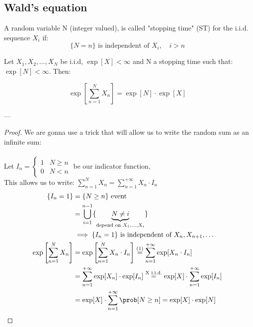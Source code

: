 \subsection{Wald's equation}
\begin{definition}
A random variable N (integer valued), is called "stopping time" (ST) for the i.i.d. sequence $X_i$ if:
\begin{equation}
  \{N=n\} \text{ is independent of }X_i ,\quad i > n
\end{equation}
\end{definition}
\begin{theorem}
Let $X_1, X_2, \dots, X_N $ be i.i.d,  $\exp[X] < \infty$ and N a stopping time such that: $\exp[N] < \infty$. Then:

\begin{equation}
  \exp\left[\sum\limits_{n=1}^N X_n \right] = \exp[N] \cdot \exp[X]
\end{equation}
\end{theorem}
---
\begin{proof}
  We are gonna use a trick that will allow us to write the random sum as an infinite sum:\\ \\
  Let $I_n = \begin{cases} 1 & N \ge n \\ 0 & N<n \end{cases}$ \quad be our indicator function,\\
  This allows us to write: $\sum\limits_{n=1}^N X_n = \sum\limits_{n=1}^{+\infty} X_n \cdot I_n$
\begin{equation}\begin{split}
  \{I_n=1\} &= \{N \ge n \} \text{ event}\\
  &= \bigcup\limits_{i=1}^{n-1}\{\underbrace{N \neq i}_{\text{depend on } X_1, \dots, X_i} \} \\
  &\implies \{I_n=1\} \text{ is independent of }X_n, X_{n+1}, \dots\\
  \exp\left[\sum\limits_{n=1}^{N}X_n\right] &= \exp\left[\sum\limits_{n=1}^{N}X_n \cdot I_n \right] \stackrel{(1)}{=} \sum\limits_{n=1}^{+\infty}\exp[X_n \cdot I_n] \\
  &=\sum\limits_{n=1}^{+\infty}\exp[X_n] \cdot \exp[I_n] \stackrel{\text{X i.i.d.}}{=} \exp[X]\cdot\sum\limits_{n=1}^{+\infty}\exp[I_n] \\
  &= \exp[X] \cdot \sum\limits_{n=1}^{+\infty}\prob[N \ge n] = \exp[X] \cdot \exp[N]
\end{split}\label{wald:proof}\end{equation}
\end{proof}
